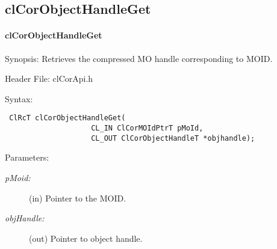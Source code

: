 \begin{flushleft}
\subsection{clCorObjectHandleGet}
\hypertarget{pagecor140}{}\paragraph{cl\-Cor\-Object\-Handle\-Get}\label{pagecor140}
\begin{Desc}
\item[Synopsis:]Retrieves the compressed MO handle corresponding to MOID.\end{Desc}
\begin{Desc}
\item[Header File:]clCorApi.h\end{Desc}
\begin{Desc}
\item[Syntax:]

\footnotesize\begin{verbatim} ClRcT clCorObjectHandleGet(
					CL_IN ClCorMOIdPtrT pMoId,
					CL_OUT ClCorObjectHandleT *objhandle);

\end{verbatim}
\normalsize
\end{Desc}
\begin{Desc}
\item[Parameters:]
\begin{description}
\item[{\em p\-Moid:}](in) Pointer to the MOID.
\item[{\em *obj\-Handle:}](out) Pointer to object handle.
\end{description}


\end{Desc}
\end{flushleft}
